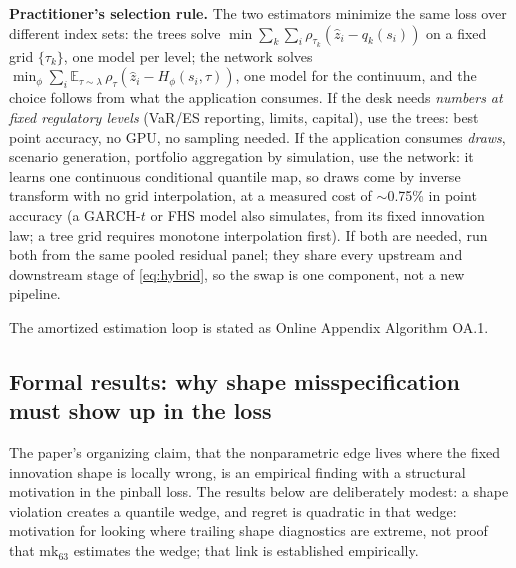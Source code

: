 \documentclass[11pt]{article}
\theoremstyle{remark}
\begin{document}
\noindent\textbf{Practitioner's selection rule.} The two estimators
minimize the same loss over different index sets: the trees solve
$\min \sum_{k}\sum_{i}\rho_{\tau_k}(\widehat{z}_i - q_k(s_i))$ on a
fixed grid $\{\tau_k\}$, one model per level; the network solves
$\min_\phi \sum_i \mathbb{E}_{\tau\sim\lambda}\,
\rho_\tau(\widehat{z}_i - H_\phi(s_i,\tau))$, one model for the continuum, and the choice follows from what the application consumes.
If the desk needs \emph{numbers at fixed regulatory levels} (VaR/ES
reporting, limits, capital), use the trees: best point accuracy, no
GPU, no sampling needed. If the application consumes \emph{draws}, scenario generation, portfolio aggregation by simulation, use the network: it learns one continuous conditional quantile map, so
draws come by inverse transform with no grid interpolation, at a
measured cost of $\sim$0.75\% in point accuracy (a GARCH-$t$ or FHS
model also simulates, from its fixed innovation law; a tree grid
requires monotone interpolation first). If both are needed,
run both from the same pooled residual panel; they share every upstream
and downstream stage of \eqref{eq:hybrid}, so the swap is one component,
not a new pipeline.

\noindent The amortized estimation loop is stated as Online Appendix Algorithm OA.1.

\subsection{Formal results: why shape misspecification must show up in
the loss}\label{sec:theory}

The paper's organizing claim, that the nonparametric edge lives where
the fixed innovation shape is locally wrong, is an empirical finding with a structural motivation in the pinball loss. The results
below are deliberately modest: a shape violation creates a quantile
wedge, and regret is quadratic in that wedge: motivation for looking where trailing shape diagnostics are extreme, not proof that
mk$_{63}$ estimates the wedge; that link is established empirically.
\end{document}
